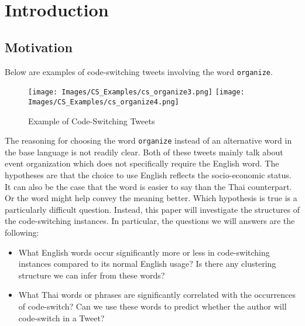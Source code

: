 \documentclass[conference]{IEEEtran}
\begin{document}
\section{Introduction}






 

\subsection{Motivation}
Below are examples of code-switching tweets involving the word {\tt organize}.

\begin{figure}[H]
	\centering
	\texttt{[image: Images/CS\_Examples/cs\_organize3.png]}
	\texttt{[image: Images/CS\_Examples/cs\_organize4.png]}
	\caption{Example of Code-Switching Tweets}
	\label{fig:ex_csTweets}
\end{figure}


  The reasoning for choosing  the word {\tt organize} instead of an alternative word in the base language is not readily clear. Both of these tweets mainly talk about event organization which does not specifically require the English word. The hypotheses are that the choice to use English reflects the socio-economic status. It can also be the case that the word is easier to say than the Thai counterpart. Or the word might help convey the meaning better. Which hypothesis is true is a particularly difficult question. Instead, this paper will investigate the structures of the code-switching instances.  %
In particular, the questions we will answers are the following:

\begin{itemize}
\item What English words occur significantly more or less in code-switching instances compared to its normal English usage? Is there any clustering structure we can infer from these words?
\item What Thai words or phrases are significantly correlated with the occurrences of code-switch? Can we use these words to predict whether the author will code-switch in a Tweet?
\end{itemize}
\end{document}
